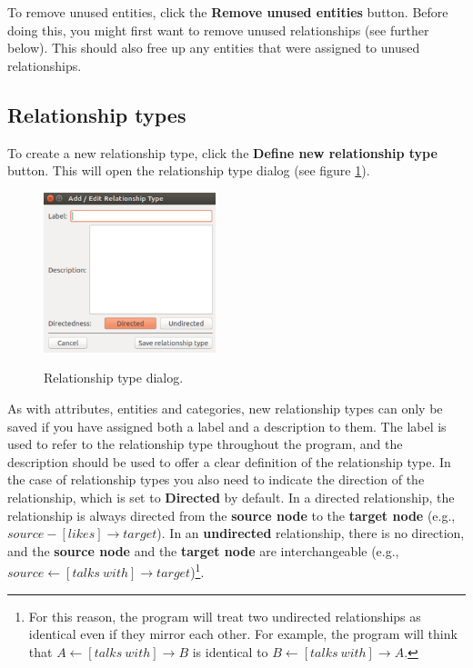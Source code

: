 \documentclass{memoir}
\begin{document}
To remove unused entities, click the \textbf{Remove unused entities} button. Before doing this, you might first want to remove unused relationships (see further below). This should also free up any entities that were assigned to unused relationships.

\subsection{Relationship types}
\label{sec:relationshiptypes}

To create a new relationship type, click the \textbf{Define new relationship type} button. This will open the relationship type dialog (see figure \ref{fig:relationshiptypedialog}). 

\begin{figure}[h!]
  \centering
  \caption{Relationship type dialog.}
  \includegraphics[width=50mm]{Screenshot_17.pdf}
  \label{fig:relationshiptypedialog}
\end{figure}

As with attributes, entities and categories, new relationship types can only be saved if you have assigned both a label and a description to them. The label is used to refer to the relationship type throughout the program, and the description should be used to offer a clear definition of the relationship type. In the case of relationship types you also need to indicate the direction of the relationship, which is set to \textbf{Directed} by default. In a directed relationship, the relationship is always directed from the \textbf{source node} to the \textbf{target node} (e.g., \(source-[likes]\rightarrow target\)). In an \textbf{undirected} relationship, there is no direction, and the \textbf{source node} and the \textbf{target node} are interchangeable (e.g., \(source\leftarrow [talks\ with]\rightarrow target\))\footnote{For this reason, the program will treat two undirected relationships as identical even if they mirror each other. For example, the program will think that \(A\leftarrow [talks\ with]\rightarrow B\) is identical to \(B\leftarrow [talks\ with]\rightarrow A\).}. 
\end{document}
